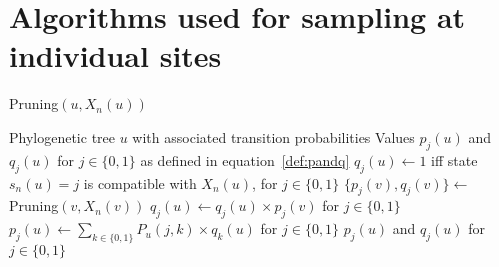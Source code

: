 \documentclass[11pt]{article}
\newcommand{\child}[1]{\ensuremath{\mathrm{child}(#1)}}
\begin{document}
\clearpage

\section{Algorithms used for sampling at individual sites}

\begin{algorithm}[h!]
  \begin{algorithmic}[1]
    \caption{Pruning$(u, X_n(u))$}\label{alg:bottomup}
    \REQUIRE Phylogenetic tree $u$ with associated transition probabilities
    \ENSURE Values $p_j(u)$ and $q_j(u)$ for $j\in \{0, 1\}$ as defined in equation~\eqref{def:pandq}
    \STATE $q_j(u) \gets 1$ iff state $s_n(u) = j$ is compatible with $X_n(u)$, for $j\in \{0,1\}$
    \STATE $\{p_j(v), q_j(v)\} \gets$ Pruning$(v, X_n(v))$
    \STATE $q_j(u) \gets q_j(u) \times p_{j}(v)$ for $j\in \{0,1\}$
    \ENDFOR
    \STATE $p_j(u) \gets \sum_{k\in\{0,1\}} P_u(j, k) \times q_k(u)$ for $j\in\{0,1\}$
    \RETURN $p_j(u)$ and $q_j(u)$ for $j\in\{0,1\}$
  \end{algorithmic}
\end{algorithm}

\end{document}
